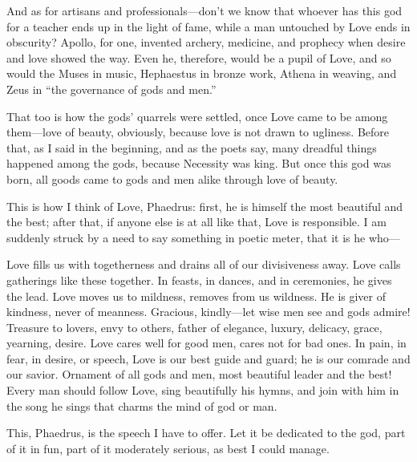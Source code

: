 And as for artisans and professionals---don’t we know that whoever has
this god for a teacher ends up in the light of fame, while a man
untouched by Love ends in obscurity? Apollo, for one, invented archery,
 medicine, and prophecy when desire and love showed the way. Even
he, therefore, would be a pupil of Love, and so would the Muses in
music, Hephaestus in bronze work, Athena in weaving, and Zeus in “the
governance of gods and men.”

That too is how the gods’ quarrels were settled, once Love came to be
among them---love of beauty, obviously, because love is not drawn to
ugliness. Before that, as I said in the beginning, and as the poets say,
many dreadful things happened among the gods, because Necessity was
king.  But once this god was born, all goods came to gods and men
alike through love of beauty.

This is how I think of Love, Phaedrus: first, he is himself the most
beautiful and the best; after that, if anyone else is at all like that,
Love is responsible. I am suddenly struck by a need to say something in
poetic meter, that it
is he who---

\blank[line]
\par
{}
\blank[line]

Love fills us with togetherness and drains all of our divisiveness away.
Love calls gatherings like these together. In feasts, in dances, and in
ceremonies, he gives the lead. Love moves us to mildness, removes from
us wildness. He is giver of kindness, never of meanness. Gracious,
kindly---let wise men
see and gods admire! Treasure to lovers, envy to others, father of
elegance, luxury, delicacy, grace, yearning, desire. Love cares 
well for good men, cares not for bad ones. In pain, in fear, in desire,
or speech, Love is our best guide and guard; he is our comrade and our
savior. Ornament of all gods and men, most beautiful leader and the
best! Every man should follow Love, sing beautifully his hymns, and join
with him in the song he sings that charms the mind of god or man.

This, Phaedrus, is the speech I have to offer. Let it be dedicated to
the  god, part of it in fun, part of it moderately
serious, as best I could manage.

